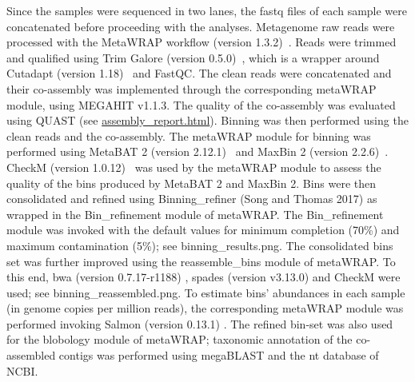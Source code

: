    Since the samples were sequenced in two lanes, the fastq files of each sample were concatenated before proceeding with the analyses. 
   Metagenome raw reads were processed with the MetaWRAP workflow (version 1.3.2)~\citep{uritskiy_metawrapflexible_2018}. 
   Reads were trimmed and qualified using Trim Galore (version 0.5.0)~\citep{krueger_trim_2022}, which is a wrapper around Cutadapt (version 1.18)~\citep{martin_cutadapt_2011} and FastQC. 
   The clean reads were concatenated and their co-assembly was implemented through the corresponding metaWRAP module, using MEGAHIT v1.1.3. 
   The quality of the co-assembly was evaluated using QUAST \citep{gurevich_quast_2013} (see \href{https://github.com/hariszaf/karpathos-swamp/blob/main/metaWRAP/assembly_report.html}{assembly\_report.html}). 
   Binning was then performed using the clean reads and the co-assembly. 
   The metaWRAP module for binning was performed using MetaBAT 2 (version 2.12.1)~\citep{kang_metabat_2019} and MaxBin 2 (version 2.2.6)~\citep{wu_maxbin_2016}. 
   CheckM (version 1.0.12)~\citep{parks_checkm_2015} was used by the metaWRAP module to assess the quality of the bins produced by MetaBAT 2 and MaxBin 2. 
   Bins were then consolidated and refined using Binning\_refiner (Song and Thomas 2017) as wrapped in the Bin\_refinement module of metaWRAP. 
   The Bin\_refinement module was invoked with the default values for minimum completion (70\%) and maximum contamination (5\%); 
   see binning\_results.png. 
   The consolidated bins set was further improved using the reassemble\_bins module of metaWRAP. 
   To this end, bwa (version 0.7.17-r1188) \citep{li_fast_2009}, spades (version v3.13.0) \citep{nurk_metaspades_2017} and CheckM were used; 
   see binning\_reassembled.png. 
   To estimate bins’ abundances in each sample (in genome copies per million reads), the corresponding metaWRAP module was performed invoking Salmon (version 0.13.1) \citep{patro_salmon_2017}. 
   The refined bin-set was also used for the blobology module of metaWRAP; 
   taxonomic annotation of the co-assembled contigs was performed using megaBLAST and the nt database of NCBI. 

